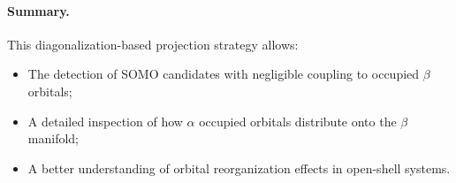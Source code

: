 \paragraph{Summary.}
This diagonalization-based projection strategy allows:

\begin{itemize}
    \item The detection of SOMO candidates with negligible coupling to occupied $\beta$ orbitals;
    \item A detailed inspection of how $\alpha$ occupied orbitals distribute onto the $\beta$ manifold;
    \item A better understanding of orbital reorganization effects in open-shell systems.
\end{itemize}

